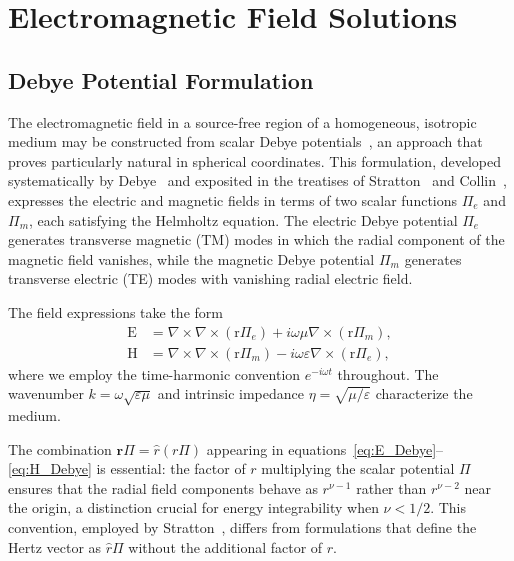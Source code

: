\documentclass[
  aip,
  amsmath,amssymb,
  preprint
]{revtex4-1}
\begin{document}
\section{Electromagnetic Field Solutions}

\label{EM}

\subsection{Debye Potential Formulation}


The electromagnetic field in a source-free region of a homogeneous, isotropic medium may be constructed from scalar Debye potentials~\cite{Debye1909}, an approach that proves particularly natural in spherical coordinates. This formulation, developed systematically by Debye~\cite{Debye1909} and exposited in the treatises of Stratton~\cite{Stratton1941} and Collin~\cite{Collin1991}, expresses the electric and magnetic fields in terms of two scalar functions $\Pi_e$ and $\Pi_m$, each satisfying the Helmholtz equation. The electric Debye potential $\Pi_e$ generates transverse magnetic (TM) modes in which the radial component of the magnetic field vanishes, while the magnetic Debye potential $\Pi_m$ generates transverse electric (TE) modes with vanishing radial electric field.

The field expressions take the form
\begin{align}
\mathrm{E} &= \nabla \times \nabla \times (\mathrm{r}\Pi_e) + i\omega\mu\nabla \times (\mathrm{r}\Pi_m), \label{eq:E_Debye} \\
\mathrm{H} &= \nabla \times \nabla \times (\mathrm{r}\Pi_m) - i\omega\varepsilon\nabla \times (\mathrm{r}\Pi_e), \label{eq:H_Debye}
\end{align}
where we employ the time-harmonic convention $e^{-i\omega t}$ throughout. The wavenumber $k = \omega\sqrt{\varepsilon\mu}$ and intrinsic impedance $\eta = \sqrt{\mu/\varepsilon}$ characterize the medium.

The combination $\mathbf{r}\Pi = \hat{r}(r\Pi)$ appearing in equations~\eqref{eq:E_Debye}--\eqref{eq:H_Debye} is essential: the factor of $r$ multiplying the scalar potential $\Pi$ ensures that the radial field components behave as $r^{\nu-1}$ rather than $r^{\nu-2}$ near the origin, a distinction crucial for energy integrability when $\nu < 1/2$. This convention, employed by Stratton~\cite{Stratton1941}, differs from formulations that define the Hertz vector as $\hat{r}\Pi$ without the additional factor of $r$.
\end{document}
